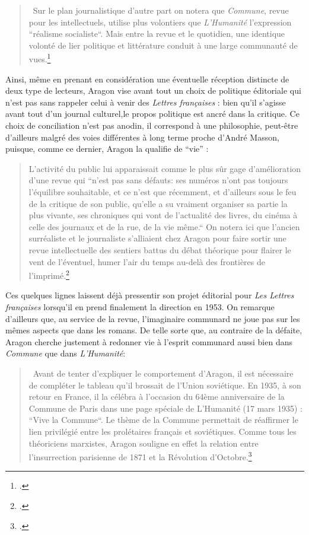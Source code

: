 \begin{quote}
 Sur le plan journalistique d’autre part on notera que \emph{Commune}, revue pour les intellectuels, utilise plus volontiers que \emph{L’Humanité} l’expression “réalisme socialiste“. Mais entre la revue et le quotidien, une identique volonté de lier politique et littérature conduit à une large communauté de vues.\footcite[p157]{lavoinne}\end{quote}

Ainsi, même en prenant en considération une éventuelle réception distincte de deux type de lecteurs, Aragon vise avant tout un choix de politique éditoriale qui n'est pas sans rappeler celui à venir des \emph{Lettres françaises} : bien qu'il s'agisse avant tout d'un journal culturel,le propos politique est ancré dans la critique. Ce choix de conciliation n'est pas anodin, il correspond à une philosophie, peut-être d'ailleurs malgré des voies différentes à long terme proche d'André Masson, puisque, comme ce dernier, Aragon la qualifie de \enquote{vie} :

\begin{quote}
 L’activité du public lui apparaissait comme le plus sûr gage d’amélioration d’une revue qui “n’est pas sans défauts: ses numéros n’ont pas toujours l’équilibre souhaitable, et ce n’est que récemment,  et d’ailleurs sous le feu de la critique de son public, qu’elle a su vraiment organiser sa partie la plus vivante, ses chroniques qui vont de l'actualité des livres, du cinéma à celle des journaux et de la rue, de la vie même.“ On notera ici que l’ancien surréaliste et le journaliste s’alliaient chez Aragon pour faire sortir une revue intellectuelle des sentiers battus du débat théorique pour flairer le vent de l’éventuel, humer l’air du temps au-delà des frontières de l’imprimé.\footcite[p205]{lavoinne}\end{quote}

Ces quelques lignes laissent déjà pressentir son projet éditorial pour \emph{Les Lettres françaises} lorsqu'il en prend finalement la direction en 1953. On remarque d'ailleurs que, au service de la revue, l'imaginaire communard ne joue pas sur les mêmes aspects que dans les romans. De telle sorte que, au contraire de la défaite, Aragon cherche justement à redonner vie à l'esprit communard aussi bien dans \emph{Commune} que dans \emph{L'Humanité}:  

\begin{quote}
 Avant de tenter d’expliquer le comportement d’Aragon, il est nécessaire de compléter le tableau qu’il brossait de l’Union soviétique. En 1935, à son retour en France, il la célébra à l’occasion du 64ème anniversaire de la Commune de Paris dans une page spéciale de L’Humanité (17 mars 1935) : “Vive la Commune“. 
Le thème de la Commune permettait de réaffirmer le lien privilégié entre les prolétaires français et soviétiques. Comme tous les théoriciens marxistes, Aragon souligne en effet la relation entre l’insurrection parisienne de 1871 et la Révolution d’Octobre.\footcite[p133]{lavoinne}
\end{quote}

